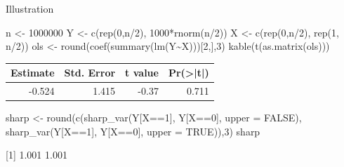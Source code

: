 \documentclass[
  11pt,
  ignorenonframetext,
]{beamer}
\newenvironment{Shaded}{\begin{snugshade}}{\end{snugshade}}
\newcommand{\AttributeTok}[1]{\textcolor[rgb]{0.40,0.45,0.13}{#1}}
\newcommand{\ConstantTok}[1]{\textcolor[rgb]{0.56,0.35,0.01}{#1}}
\newcommand{\DecValTok}[1]{\textcolor[rgb]{0.68,0.00,0.00}{#1}}
\newcommand{\FunctionTok}[1]{\textcolor[rgb]{0.28,0.35,0.67}{#1}}
\newcommand{\NormalTok}[1]{\textcolor[rgb]{0.00,0.23,0.31}{#1}}
\newcommand{\OtherTok}[1]{\textcolor[rgb]{0.00,0.23,0.31}{#1}}
\newcommand{\SpecialCharTok}[1]{\textcolor[rgb]{0.37,0.37,0.37}{#1}}
\begin{document}
\begin{frame}[fragile]{Illustration}
\protect\hypertarget{illustration}{}
\begin{Shaded}
\begin{Highlighting}[]
\NormalTok{n   }\OtherTok{\textless{}{-}} \DecValTok{1000000}
\NormalTok{Y   }\OtherTok{\textless{}{-}} \FunctionTok{c}\NormalTok{(}\FunctionTok{rep}\NormalTok{(}\DecValTok{0}\NormalTok{,n}\SpecialCharTok{/}\DecValTok{2}\NormalTok{), }\DecValTok{1000}\SpecialCharTok{*}\FunctionTok{rnorm}\NormalTok{(n}\SpecialCharTok{/}\DecValTok{2}\NormalTok{))}
\NormalTok{X   }\OtherTok{\textless{}{-}} \FunctionTok{c}\NormalTok{(}\FunctionTok{rep}\NormalTok{(}\DecValTok{0}\NormalTok{,n}\SpecialCharTok{/}\DecValTok{2}\NormalTok{), }\FunctionTok{rep}\NormalTok{(}\DecValTok{1}\NormalTok{, n}\SpecialCharTok{/}\DecValTok{2}\NormalTok{))}
\NormalTok{ols }\OtherTok{\textless{}{-}} \FunctionTok{round}\NormalTok{(}\FunctionTok{coef}\NormalTok{(}\FunctionTok{summary}\NormalTok{(}\FunctionTok{lm}\NormalTok{(Y}\SpecialCharTok{\textasciitilde{}}\NormalTok{X)))[}\DecValTok{2}\NormalTok{,],}\DecValTok{3}\NormalTok{)}
\FunctionTok{kable}\NormalTok{(}\FunctionTok{t}\NormalTok{(}\FunctionTok{as.matrix}\NormalTok{(ols)))}
\end{Highlighting}
\end{Shaded}

\begin{tabular}{r|r|r|r}
\hline
Estimate & Std. Error & t value & Pr(>|t|)\\
\hline
-0.524 & 1.415 & -0.37 & 0.711\\
\hline
\end{tabular}

\begin{Shaded}
\begin{Highlighting}[]
\NormalTok{sharp }\OtherTok{\textless{}{-}} \FunctionTok{round}\NormalTok{(}\FunctionTok{c}\NormalTok{(}\FunctionTok{sharp\_var}\NormalTok{(Y[X}\SpecialCharTok{==}\DecValTok{1}\NormalTok{], Y[X}\SpecialCharTok{==}\DecValTok{0}\NormalTok{], }\AttributeTok{upper =} \ConstantTok{FALSE}\NormalTok{), }
                 \FunctionTok{sharp\_var}\NormalTok{(Y[X}\SpecialCharTok{==}\DecValTok{1}\NormalTok{], Y[X}\SpecialCharTok{==}\DecValTok{0}\NormalTok{], }\AttributeTok{upper =} \ConstantTok{TRUE}\NormalTok{)),}\DecValTok{3}\NormalTok{)}
\NormalTok{sharp}
\end{Highlighting}
\end{Shaded}

{[}1{]} 1.001 1.001
\end{frame}
\end{document}
